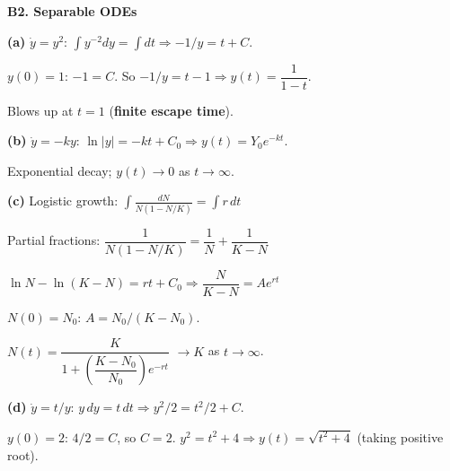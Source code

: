 \documentclass[12pt, a4paper]{article}
\theoremstyle{definition}
\begin{document}
\begin{solbox}
\textbf{B2. Separable ODEs}

\textbf{(a)} $\dot y=y^2$: $\displaystyle\int y^{-2}dy=\int dt \Rightarrow -1/y=t+C$.

$y(0)=1$: $-1=C$. So $-1/y=t-1 \Rightarrow y(t)=\dfrac{1}{1-t}$.

Blows up at $t=1$ (\textbf{finite escape time}).

\textbf{(b)} $\dot y=-ky$: $\ln|y|=-kt+C_0 \Rightarrow y(t)=Y_0 e^{-kt}$.

Exponential decay; $y(t)\to 0$ as $t\to\infty$.

\textbf{(c)} Logistic growth:
$\displaystyle\int\frac{dN}{N(1-N/K)}=\int r\,dt$

Partial fractions: $\dfrac{1}{N(1-N/K)}=\dfrac{1}{N}+\dfrac{1}{K-N}$

$\ln N - \ln(K-N)=rt+C_0 \Rightarrow \dfrac{N}{K-N}=Ae^{rt}$

$N(0)=N_0$: $A=N_0/(K-N_0)$.

$N(t)=\dfrac{K}{1+\left(\dfrac{K-N_0}{N_0}\right)e^{-rt}}$ \quad $\to K$ as $t\to\infty$.

\textbf{(d)} $\dot y=t/y$: $y\,dy=t\,dt \Rightarrow y^2/2=t^2/2+C$.

$y(0)=2$: $4/2=C$, so $C=2$. $y^2=t^2+4 \Rightarrow y(t)=\sqrt{t^2+4}$ (taking positive root).
\end{solbox}
\end{document}
